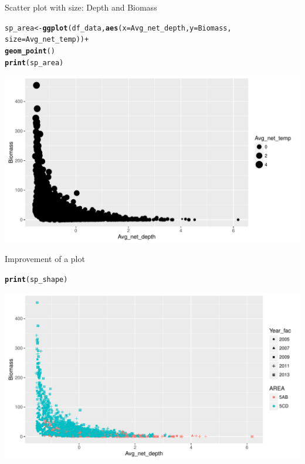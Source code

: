 \documentclass{beamer}\usepackage[]{graphicx}\usepackage[]{color}
\makeatletter
\newcommand{\hlopt}[1]{\textcolor[rgb]{0,0,0}{#1}}%
\newcommand{\hlstd}[1]{\textcolor[rgb]{0.345,0.345,0.345}{#1}}%
\newcommand{\hlkwb}[1]{\textcolor[rgb]{0.69,0.353,0.396}{#1}}%
\newcommand{\hlkwc}[1]{\textcolor[rgb]{0.333,0.667,0.333}{#1}}%
\newcommand{\hlkwd}[1]{\textcolor[rgb]{0.737,0.353,0.396}{\textbf{#1}}}%
\newenvironment{kframe}{%
 \def\at@end@of@kframe{}%
 \ifinner\ifhmode%
  \def\at@end@of@kframe{\end{minipage}}%
  \begin{minipage}{\columnwidth}%
 \fi\fi%
 \def\FrameCommand##1{\hskip\@totalleftmargin \hskip-\fboxsep
 \colorbox{shadecolor}{##1}\hskip-\fboxsep
     \hskip-\linewidth \hskip-\@totalleftmargin \hskip\columnwidth}%
 \MakeFramed {\advance\hsize-\width
   \@totalleftmargin\z@ \linewidth\hsize
   \@setminipage}}%
 {\par\unskip\endMakeFramed%
 \at@end@of@kframe}
\newenvironment{knitrout}{}{} %
\makeatother
\begin{document}
\begin{frame}[fragile]{Scatter plot with size: Depth and Biomass}
\begin{knitrout}\footnotesize
{}\color{fgcolor}\begin{kframe}
\begin{alltt}
\hlstd{sp_area} \hlkwb{<-} \hlkwd{ggplot}\hlstd{(df_data,} \hlkwd{aes}\hlstd{(}\hlkwc{x}\hlstd{=Avg_net_depth,} \hlkwc{y}\hlstd{=Biomass,}
                               \hlkwc{size}\hlstd{=Avg_net_temp))} \hlopt{+}
  \hlkwd{geom_point}\hlstd{()}
\hlkwd{print}\hlstd{(sp_area)}
\end{alltt}
\end{kframe}

{\centering \includegraphics[width=.9\linewidth]{figure/scatter_plot_color_size-1} 

}



\end{knitrout}
\end{frame}

\begin{frame}[fragile]{Improvement of a plot}
\begin{knitrout}\footnotesize
{}\color{fgcolor}\begin{kframe}
\begin{alltt}
\hlkwd{print}\hlstd{(sp_shape)}
\end{alltt}
\end{kframe}

{\centering \includegraphics[width=.9\linewidth]{figure/scatter_plot_shape2-1} 

}



\end{knitrout}
\end{frame}
\end{document}
